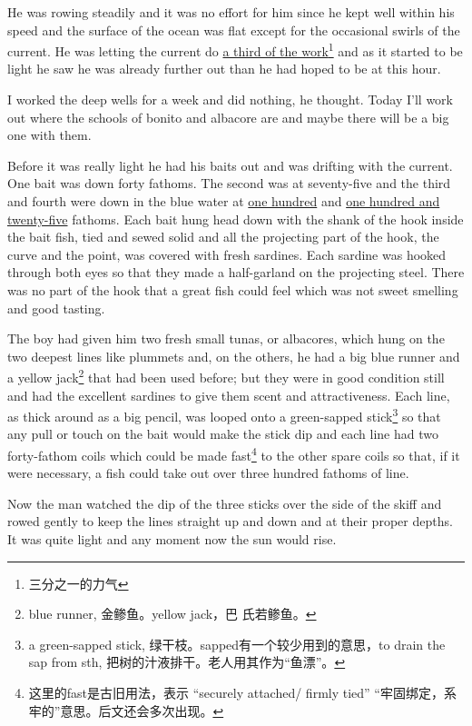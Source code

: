 \documentclass[fontset=ubuntu]{ctexrep}
\begin{document}
He was rowing \gls{steadily} and it was no \gls{effort} for him since he kept well
within his speed and the surface of the ocean was flat except for the
\gls{occasional} swirls of the current. He was letting the current do \uline{a third of
the work}\footnote{三分之一的力气} and as it started to be light he saw he was already further out
than he had hoped to be at this hour.

I worked the deep wells for a week and did nothing, he thought. Today I'll
work out where the schools of \gls{bonito} and \gls{albacore} are and maybe
there will be a big one with them.

Before it was really light he had his baits out and was \gls{drifting} with
the current. One bait was down forty fathoms. The second was at seventy-five
and the third and fourth were down in the blue water at \uline{one hundred}
and \uline{one hundred and twenty-five} fathoms. Each bait \gls{hung} head
down with the \gls{shank} of the hook inside the bait fish, \gls{tied} and
\gls{sewed} \gls{solid} and all the \gls{projecting} part of the hook, the
\gls{curve} and the point, was covered with fresh sardines. Each sardine was
hooked through both eyes so that they made a half-\gls{garland} on the
projecting \gls{steel}. There was no part of the hook that a great fish
could feel which was not sweet smelling and good tasting.

The boy had given him two fresh small tunas, or albacores, which hung on the
two deepest lines like \glspl{plummet} and, on the others, he had a big blue
\gls{runner} and a yellow jack\footnote{blue runner, 金鲹鱼。yellow jack，巴
  氏若鲹鱼。} that had been used before; but they were in good
\gls{condition} still and had the \gls{excellent} sardines to give them
\gls{scent} and \gls{attractiveness}. Each line, as \gls{thick} around as a
big pencil, was looped onto a green-sapped \gls{stick}\footnote{a
  green-sapped stick, 绿干枝。sapped有一个较少用到的意思，to drain the sap
  from sth, 把树的汁液排干。老人用其作为“鱼漂”。} so that any pull or touch on
the bait would make the stick dip and each line had two forty-fathom coils
which could be made fast\footnote{这里的fast是古旧用法，表示 ``securely
  attached/ firmly tied'' “牢固绑定，系牢的”意思。后文还会多次出现。} to
the other \gls{spare} coils so that, if it were necessary, a fish could take
out over three hundred fathoms of line.

Now the man watched the dip of the three sticks over the side of the skiff
and rowed gently to keep the lines straight up and down and at their \gls{proper}
depths. It was quite light and any moment now the sun would rise.
\end{document}

